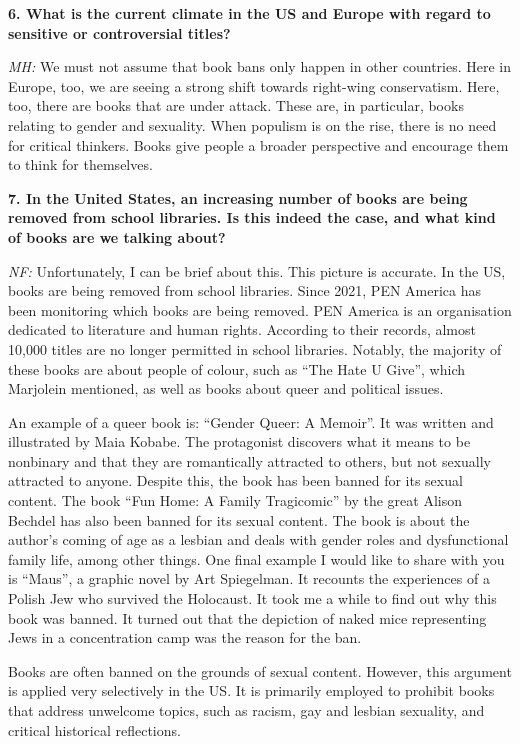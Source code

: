 \documentclass[a4paper,
fontsize=11pt,
oneside,
numbers=noperiodatend,
parskip=half-,
bibliography=totoc,
final
]{scrartcl}
\begin{document}
\textbf{6. What is the current climate in the US and Europe with regard
to sensitive or controversial titles?}

\emph{MH:} We must not assume that book bans only happen in other
countries. Here in Europe, too, we are seeing a strong shift towards
right-wing conservatism. Here, too, there are books that are under
attack. These are, in particular, books relating to gender and
sexuality. When populism is on the rise, there is no need for critical
thinkers. Books give people a broader perspective and encourage them to
think for themselves.

\textbf{7. In the United States, an increasing number of books are being
removed from school libraries. Is this indeed the case, and what kind of
books are we talking about?}

\emph{NF:} Unfortunately, I can be brief about this. This picture is
accurate. In the US, books are being removed from school libraries.
Since 2021, PEN America has been monitoring which books are being
removed. PEN America is an organisation dedicated to literature and
human rights. According to their records, almost 10,000 titles are no
longer permitted in school libraries. Notably, the majority of these
books are about people of colour, such as \enquote{The Hate U Give},
which Marjolein mentioned, as well as books about queer and political
issues.

An example of a queer book is: \enquote{Gender Queer: A Memoir}. It was
written and illustrated by Maia Kobabe. The protagonist discovers what
it means to be nonbinary and that they are romantically attracted to
others, but not sexually attracted to anyone. Despite this, the book has
been banned for its sexual content. The book \enquote{Fun Home: A Family
Tragicomic} by the great Alison Bechdel has also been banned for its
sexual content. The book is about the author's coming of age as a
lesbian and deals with gender roles and dysfunctional family life, among
other things. One final example I would like to share with you is
\enquote{Maus}, a graphic novel by Art Spiegelman. It recounts the
experiences of a Polish Jew who survived the Holocaust. It took me a
while to find out why this book was banned. It turned out that the
depiction of naked mice representing Jews in a concentration camp was
the reason for the ban.

Books are often banned on the grounds of sexual content. However, this
argument is applied very selectively in the US. It is primarily employed
to prohibit books that address unwelcome topics, such as racism, gay and
lesbian sexuality, and critical historical reflections.
\end{document}
